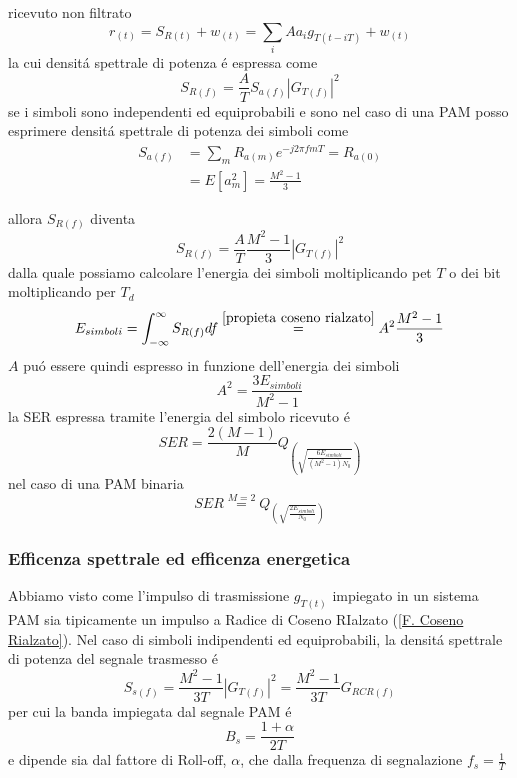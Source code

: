             ricevuto non filtrato 
            \[
                r_{(t)} = S_{R(t)} + w_{(t)} = \sum_{i}Aa_ig_{T(t-iT)}+w_{(t)}    
            \]
            la cui densitá spettrale di potenza é espressa come
            \[
                S_{R(f)} = \frac{A}{T}S_{a(f)}\left|G_{T(f)}\right|^2
            \]
            se i simboli sono independenti ed equiprobabili e sono nel caso di una PAM posso esprimere 
            densitá spettrale di potenza dei simboli come
            \begin{align}
                S_{a(f)} &= \sum_{m}R_{a(m)}e^{-j2\pi fmT} = R_{a(0)}\nonumber \\
                         &= E[a_m^2] = \frac{M^2-1}{3}\nonumber
            \end{align}
             
            allora $S_{R(f)}$ diventa
            \[
                S_{R(f)} = \frac{A}{T}\frac{M^2-1}{3}\left|G_{T(f)}\right|^2
            \]
            dalla quale possiamo calcolare l'energia dei simboli moltiplicando pet $T$ o dei bit 
            moltiplicando per $T_d$ 
            \[
                E_{simboli} = \int_{-\infty}^{\infty}S_{R(f)} df \overset{\ref{propieta coseno rialzato}}{=} A^2\frac{M^2-1}{3}  
            \]
            $A$ puó essere quindi espresso in funzione dell'energia dei simboli 
            \[
                A^2 = \frac{3E_{simboli}}{M^2-1} 
            \]  
            la SER espressa tramite l'energia del simbolo ricevuto é
            \[
                SER = \frac{2(M-1)}{M} Q_{\displaystyle\left(\sqrt{\frac{6E_{simboli}}{(M^2-1)N_0}}\right)} 
            \]
            nel caso di una PAM binaria 
            \[
                SER \overset{M=2}{=} Q_{\displaystyle\left(\sqrt{\frac{2E_{simboli}}{N_0}}\right)} 
            \]
        \subsubsection{Efficenza spettrale ed efficenza energetica}
            Abbiamo visto come l'impulso di trasmissione $g_{T(t)}$ impiegato in un sistema PAM sia tipicamente 
            un impulso a Radice di Coseno RIalzato (\ref{F. Coseno Rialzato}). Nel caso di simboli indipendenti
            ed equiprobabili, la densitá spettrale di potenza del segnale trasmesso é 
            \[
                S_{s(f)} = \frac{M^2-1}{3T}\left|G_{T(f)}\right|^2 = \frac{M^2-1}{3T} G_{RCR(f)}
            \]
            per cui la banda impiegata dal segnale PAM é 
            \[
                B_s = \frac{1+\alpha}{2T}
            \]
            e dipende sia dal fattore di Roll-off, $\alpha$, che dalla frequenza di segnalazione $f_s=\frac{1}{T}$
